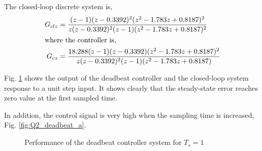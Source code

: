 \documentclass[11pt, a4paper]{article}
\begin{document}
The closed-loop discrete system is,
\begin{align*}
G_{clz} &= \dfrac{(z-1) (z-0.3392)^2 (z^2 - 1.783z + 0.8187)^2} {z (z-0.3392)^2 (z-1) (z^2 - 1.783z + 0.8187)^2} \\
\intertext{where the controller is,}
G_{cz} &= \dfrac{18.288 (z-1) (z-0.3392) (z^2 - 1.783z + 0.8187)^2}{z (z-0.3392)^2 (z-1) (z^2 - 1.783z + 0.8187)}
\end{align*}

Fig. \ref{fig:Q2_deadbeat} shows the output of the deadbeat controller and the closed-loop system response to a unit step input. It shows clearly that the steady-state error reaches zero value at the first sampled time.

In addition, the control signal is very high when the sampling time is increased, Fig. \ref{fig:Q2_deadbeat_a}.

\begin{figure}[H]
	\centering
	\caption{Performance of the deadbeat controller system for $T_s=1$}
	\label{fig:Q2_deadbeat}
\end{figure}
\end{document}
